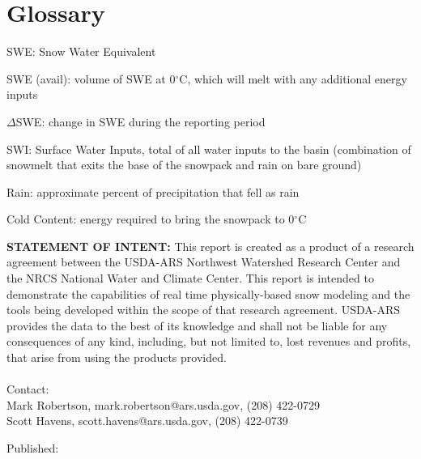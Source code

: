 \documentclass[11pt, oneside]{article}   	%
\begin{document}
\clearpage



\clearpage
\section*{Glossary}

\begin{itemize}
	\setlength\itemsep{0.05em}
	\footnotesize{
		\item[] SWE: Snow Water Equivalent
		\item[] SWE (avail): volume of SWE at 0$^{\circ}$C, which will melt with any additional energy inputs
		\item[] $\Delta$SWE: change in SWE during the reporting period
		\item[] SWI: Surface Water Inputs, total of all water inputs to the basin (combination of snowmelt that exits the base of the snowpack and rain on bare ground)
		\item[] Rain: approximate percent of precipitation that fell as rain
		\item[] Cold Content: energy required to bring the snowpack to 0$^{\circ}$C
	}
\end{itemize}

\vspace{1cm}

\noindent\textbf{STATEMENT OF INTENT:} This report is created as a product of a research agreement between the USDA-ARS Northwest Watershed Research Center and the NRCS National Water and Climate Center. This report is intended to demonstrate the capabilities of real time physically-based snow modeling and the tools being developed within the scope of that research agreement. USDA-ARS provides the data to the best of its knowledge and shall not be liable for any consequences of any kind, including, but not limited to, lost revenues and profits, that arise from using the products provided. \\
\vspace{1cm}  \\
\noindent
Contact: \\
\hspace{2cm} Mark Robertson, mark.robertson@ars.usda.gov, (208) 422-0729 \\
\hspace{2cm} Scott Havens, scott.havens@ars.usda.gov, (208) 422-0739 \\

\par\vspace*{\fill}
\noindent
\footnotesize{
Published: 
}
\end{document}
